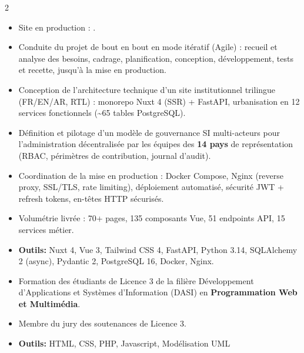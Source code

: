 \documentclass[10pt,a4paper,ragged2e,withhyper]{altacv}
\begin{document}
\begin{paracol}{2}
            \begin{itemize}
                \item Site en production : .
                \item Conduite du projet de bout en bout en mode itératif (Agile) : recueil et analyse des besoins, cadrage, planification, conception, développement, tests et recette, jusqu'à la mise en production.
                \item Conception de l'architecture technique d'un site institutionnel trilingue (FR/EN/AR, RTL) : monorepo Nuxt 4 (SSR) + FastAPI, urbanisation en 12 services fonctionnels (\textasciitilde65 tables PostgreSQL).
                \item Définition et pilotage d'un modèle de gouvernance SI multi-acteurs pour l'administration décentralisée par les équipes des \textbf{14 pays} de représentation (RBAC, périmètres de contribution, journal d'audit).
                \item Coordination de la mise en production : Docker Compose, Nginx (reverse proxy, SSL/TLS, rate limiting), déploiement automatisé, sécurité JWT + refresh tokens, en-têtes HTTP sécurisés.
                \item Volumétrie livrée : 70+ pages, 135 composants Vue, 51 endpoints API, 15 services métier.
                \item \textcolor{SecondaryColor}{\textbf{Outils: }} Nuxt 4, Vue 3, Tailwind CSS 4, FastAPI, Python 3.14, SQLAlchemy 2 (async), Pydantic 2, PostgreSQL 16, Docker, Nginx.
            \end{itemize}
            \divider


            \begin{itemize}
                \item Formation des étudiants de Licence 3 de la filière Développement d'Applications et Systèmes d'Information (DASI) en {\textbf{Programmation Web et Multimédia}}.
                \item Membre du jury des soutenances de Licence 3.
                \item \textcolor{SecondaryColor}{\textbf{Outils: }} HTML, CSS, PHP, Javascript, Modélisation UML
            \end{itemize}
            \divider


\end{paracol}
\end{document}
